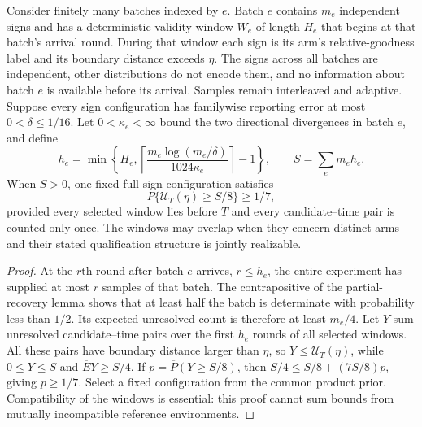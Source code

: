 \begin{proposition}
\label{prop:truncated_windows}
Consider finitely many batches indexed by $e$. Batch $e$ contains $m_e$
independent signs and has a deterministic validity window $W_e$ of length
$H_e$ that begins at that batch's arrival round. During that window each sign
is its arm's relative-goodness label and
its boundary distance exceeds $\eta$. The signs across all batches are
independent, other distributions do not encode them, and no information
about batch $e$ is available before its arrival. Samples remain interleaved
and adaptive. Suppose every sign configuration has familywise reporting error
at most $0<\delta\le1/16$. Let $0<\kappa_e<\infty$ bound the two directional
divergences in batch $e$, and define
\[
 h_e=\min\left\{H_e,
 \left\lceil\frac{m_e\log(m_e/\delta)}{1024\kappa_e}\right\rceil-1\right\},
 \qquad S=\sum_e m_eh_e.
\]
When $S>0$, one fixed full sign configuration satisfies
\[
 P\{\mathcal U_T(\eta)\ge S/8\}\ge1/7,
\]
provided every selected window lies before $T$ and every candidate--time pair
is counted only once. The windows may overlap when they concern distinct
arms and their stated qualification structure is jointly realizable.
\end{proposition}
\begin{proof}
At the $r$th round after batch $e$ arrives, $r\le h_e$, the entire experiment
has supplied at most $r$ samples of that batch. The contrapositive of the
partial-recovery lemma shows that at least half the batch is determinate with
probability less than $1/2$. Its expected unresolved count is therefore at
least $m_e/4$. Let $Y$ sum unresolved candidate--time pairs over the first
$h_e$ rounds of all selected windows. All these pairs have boundary distance
larger than $\eta$, so $Y\le\mathcal U_T(\eta)$, while $0\le Y\le S$ and
$\overline EY\ge S/4$. If $p=\overline P(Y\ge S/8)$, then
$S/4\le S/8+(7S/8)p$, giving $p\ge1/7$. Select a fixed configuration from
the common product prior. Compatibility of the windows is essential: this
proof cannot sum bounds from mutually incompatible reference environments.
\end{proof}
